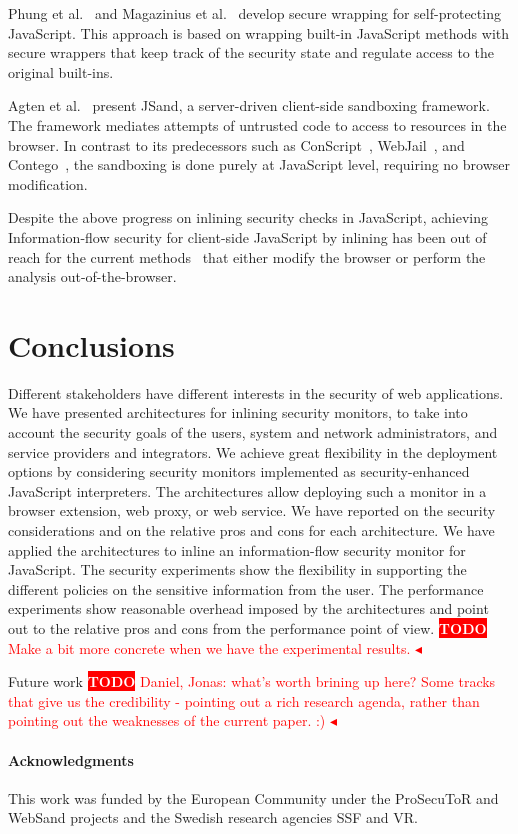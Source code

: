 \documentclass{llncs}
\newcommand{\todo}[1]{\colorbox{red}{\textcolor{white}{\sffamily\bfseries\scriptsize TODO}} \textcolor{red}{#1} \textcolor{red}{$\blacktriangleleft$}}
\begin{document}
Phung et al.~\cite{DBLP:conf/ccs/PhungSC09} and 
Magazinius et al.~\cite{DBLP:conf/nordsec/MagaziniusPS10} develop
secure wrapping for self-protecting JavaScript. This approach is based
on wrapping built-in JavaScript methods with secure wrappers that
keep track of the security state and regulate access to the original built-ins.  



Agten et al.~\cite{DBLP:conf/acsac/AgtenABPDP12} present JSand, a
server-driven client-side sandboxing framework. The framework mediates
attempts of untrusted code to access to resources in the browser.  
In contrast to its predecessors such as
ConScript~\cite{DBLP:conf/sp/MeyerovichL10}, WebJail~\cite{DBLP:conf/acsac/AckerRDPJ11}, and Contego~\cite{DBLP:conf/trust/LuoD11},
the sandboxing is done purely at JavaScript level, requiring no
browser modification.

Despite the above progress on inlining security checks in JavaScript, achieving
Information-flow security for client-side JavaScript by inlining has been out of
reach for the current methods~\cite{Vogt+:NDSS07,DBLP:conf/pldi/ChughMJL09,Yip:Narula:Krohn:Morris:EUROSYS09,Jang+:CCS10,DeGroef+:CCS12}  that either
modify the browser or perform the analysis out-of-the-browser.

\section{Conclusions}
\label{sec:conc}
Different stakeholders have different interests in the security of web
applications. We have presented architectures for inlining security
monitors, to take into account the security goals of the users, system and
network administrators, and service providers and integrators.
%
We achieve great flexibility in the deployment options by considering
security monitors implemented as security-enhanced JavaScript interpreters.
%
The architectures allow deploying such a monitor in a browser
extension, web proxy, or web service.
%
We have reported on the security considerations and on the relative pros and
cons for each architecture.
%
We have applied the architectures to inline an information-flow
security monitor for JavaScript.
%
The security experiments show the
flexibility in supporting the different policies on the sensitive
information from the user. 
%
The performance experiments show reasonable overhead imposed by the
architectures and point out to the relative pros and cons from the
performance point of view. \todo{Make a bit more concrete when we have
the experimental results.}

Future work \todo{Daniel, Jonas: what's worth brining up here? Some
tracks that give us the credibility - pointing out a rich research agenda, rather
than pointing out the weaknesses of the current paper. :) }

\paragraph{Acknowledgments}
This work was funded by 
the European Community under the ProSecuToR and WebSand projects
and
the Swedish research agencies SSF and VR.




\end{document}
